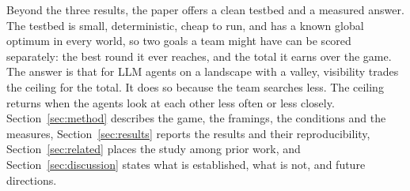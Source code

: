 Beyond the three results, the paper offers a clean testbed and a measured answer. The testbed is small, deterministic, cheap to
run, and has a known global optimum in every world, so two goals a team might have can be scored separately:
the best round it ever reaches, and the total it earns over the game. The answer is that for LLM agents on a landscape with a
valley, visibility trades the ceiling for the total. It does so because the team searches less. The ceiling
returns when the agents look at each other less often or less closely. Section~\ref{sec:method} describes the
game, the framings, the conditions and the measures, Section~\ref{sec:results} reports the results and their
reproducibility, Section~\ref{sec:related} places the study among prior work, and
Section~\ref{sec:discussion} states what is established, what is not, and future directions.
